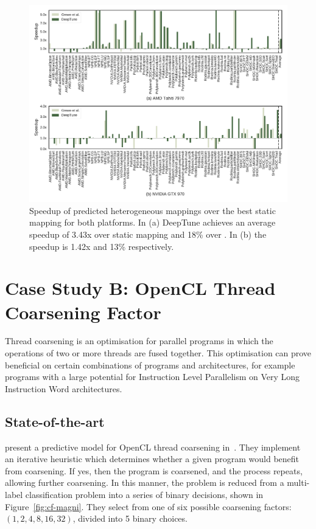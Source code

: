 \begin{figure}
	\centering %
	\includegraphics[width=\textwidth]{img/cgo-speedup}%
	\caption[Speedup of predicted heterogeneous mappings]{%
		Speedup of predicted heterogeneous mappings over the best static mapping for both platforms. In (a) DeepTune achieves an average speedup of 3.43x over static mapping and 18\% over \citeauthor{Grewe2013}. In (b) the speedup is 1.42x and 13\% respectively.%
	}
	\label{fig:cgo-speedup}
\end{figure}



\section{Case Study B: OpenCL Thread Coarsening Factor}
\label{sec:deeptune-case-study-b}

Thread coarsening is an optimisation for parallel programs in which the operations of two or more threads are fused together. This optimisation can prove beneficial on certain combinations of programs and architectures, for example programs with a large potential for Instruction Level Parallelism on Very Long Instruction Word architectures.

\subsection{State-of-the-art} \citeauthor{Magni2014}present a predictive model for OpenCL thread coarsening in~\cite{Magni2014}. They implement an iterative heuristic which determines whether a given program would benefit from coarsening. If yes, then the program is coarsened, and the process repeats, allowing further coarsening. In this manner, the problem is reduced from a multi-label classification problem into a series of binary decisions, shown in Figure~\ref{fig:cf-magni}. They select from one of six possible coarsening factors: $(1, 2, 4, 8, 16, 32)$, divided into 5 binary choices.

